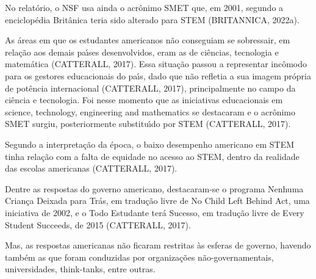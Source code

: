 \documentclass[
12pt,		%
openright,	%
twoside,  %
a4paper,			%
chapter=TITLE,		%
english,			%
french,				%
spanish,			%
brazil				%
]{USPSC-classe/USPSC}
\begin{document}
No relat\'orio, o NSF usa ainda o acr\^onimo SMET que, em 2001, segundo a enciclop\'edia Brit\^anica teria sido alterado para STEM (BRITANNICA, 2022a).









As \'areas em que os estudantes americanos n\~ao conseguiam se sobressair, em rela\c{c}\~ao aos demais pa\'{\i}ses desenvolvidos, eram as de ci\^encias, tecnologia e matem\'atica  (CATTERALL, 2017). Essa situa\c{c}\~ao passou a representar inc\^omodo para os gestores educacionais do pa\'{\i}s, dado que n\~ao refletia a sua imagem pr\'opria de pot\^encia internacional  (CATTERALL, 2017), principalmente no campo da ci\^encia e tecnologia. Foi nesse momento que as iniciativas educacionais em \textquotedbl science, technology, engineering and mathematics se destacaram e o acr\^onimo SMET surgiu, posteriormente substitu\'{\i}do por STEM  (CATTERALL, 2017).









Segundo a interpreta\c{c}\~ao da \'epoca, o baixo desempenho americano em STEM tinha rela\c{c}\~ao com a falta de equidade no acesso ao STEM, dentro da realidade das escolas americanas  (CATTERALL, 2017).









Dentre as respostas do governo americano, destacaram-se o programa \textquotedbl Nenhuma Crian\c{c}a Deixada para Tr\'as\textquotedbl , em tradu\c{c}\~ao livre de \textquotedbl No Child Left Behind Act\textquotedbl , uma iniciativa de 2002, e o \textquotedbl Todo Estudante ter\'a Sucesso\textquotedbl , em tradu\c{c}\~ao livre de \textquotedbl Every Student Succeeds\textquotedbl , de 2015  (CATTERALL, 2017).









Mas, as respostas americanas n\~ao ficaram restritas \`as esferas de governo, havendo tamb\'em as que foram conduzidas por organiza\c{c}\~oes n\~ao-governamentais, universidades, think-tanks, entre outras.
\end{document}
